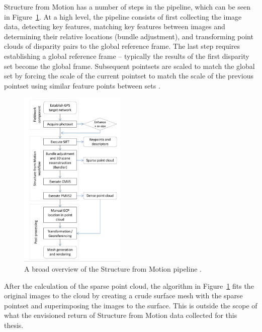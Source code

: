 \documentclass[12pt]{drexelthesis}
\begin{document}
Structure from Motion has a number of steps in the pipeline, which can be seen in Figure~\ref{sfm:pipeline}. At a high level, the pipeline consists of first collecting the image data, detecting key features, matching key features between images and determining their relative locations (bundle adjustment), and transforming point clouds of disparity pairs to the global reference frame. The last step requires establishing a global reference frame -- typically the results of the first disparity set become the global frame. Subsequent pointsets are scaled to match the global set by forcing the scale of the current pointset to match the scale of the previous pointset using similar feature points between sets \cite{WESTOBY2012300}.

\begin{figure}[!ht]
	\centering
	\includegraphics[width=2in]{instruments/sfmpipeline.png}
	\caption[Structure from Motion algorithm pipeline]{\centering A broad overview of the Structure from Motion pipeline \cite{WESTOBY2012300}.}
	\label{sfm:pipeline}
\end{figure}

After the calculation of the sparse point cloud, the algorithm in Figure~\ref{sfm:pipeline} fits the original images to the cloud by creating a crude surface mesh with the sparse pointset and superimposing the images to the surface. This is outside the scope of what the envisioned return of Structure from Motion data collected for this thesis.
\end{document}
